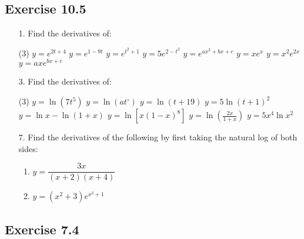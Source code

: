 \documentclass{./../../Latex/homework}
\begin{document}
\thispagestyle{plain}

\subsection*{Exercise 10.5}

\begin{enumerate}

\item[1.] Find the derivatives of:
\begin{tasks}(3)
\task $y=e^{2 t+4}$
\task $y=e^{1-9 t}$
\task $y=e^{t^{2}+ 1}$
\task $y=5 e^{2-t^{2}}$
\task $y=e^{a x^{2}+b x+c}$
\task $y=x e^{x}$
\task $y=x^{2} e^{2 x}$
\task $y=a x e^{b x+c}$	
\end{tasks}

\item[3.] Find the derivatives of:
\begin{tasks}(3)
\task $y=\ln \left(7 t^{5}\right)$
\task $y=\ln \left(a t^{\circ}\right)$
\task $y=\ln (t+19)$
\task $y=5 \ln (t+1)^{2}$
\task $y=\ln x-\ln (1+x)$
\task $y=\ln \left[x(1-x)^{8}\right]$
\task $y=\ln \left(\frac{2 x}{1+x}\right)$
\task $y=5 x^{4} \ln x^{2}$
\end{tasks}

\item[7.] Find the derivatives of the following by first taking the natural log of both sides:
\begin{enumerate}
\item $y=\dfrac{3 x}{(x+2)(x+4)}$
\item $y=\left(x^{2}+3\right) e^{x^{2}+1}$
\end{enumerate}
\end{enumerate}

\subsection*{Exercise 7.4}
\end{document}
